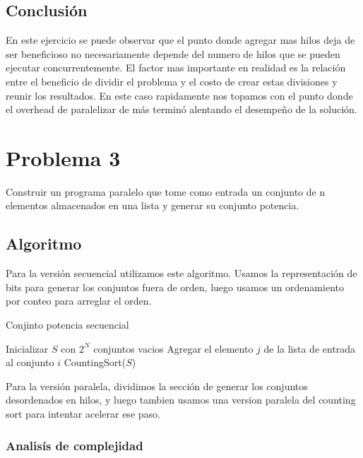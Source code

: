 \documentclass{report}
\begin{document}
\section{Conclusión}

En este ejercicio se puede observar que el punto donde agregar mas hilos deja de ser
beneficioso no necesariamente depende del numero de hilos que se pueden ejecutar
concurrentemente. El factor mas importante en realidad es la relación entre el
beneficio de dividir el problema y el costo de crear estas divisiones y reunir los
resultados. En este caso rapidamente nos topamos con el punto donde el overhead
de paralelizar de más terminó alentando el desempeño de la solución.

\chapter{Problema 3}

Construir un programa paralelo que tome como entrada un conjunto de n elementos
almacenados en una lista y generar su conjunto potencia.

\section{Algoritmo}

Para la versión secuencial utilizamos este algoritmo. Usamos la representación
de bits para generar los conjuntos fuera de orden, luego usamos un ordenamiento
por conteo para arreglar el orden.

\begin{algorithm}
\caption{Conjinto potencia secuencial}\label{euclid}
\begin{algorithmic}[1]
\State Inicializar $S$ con $2^N$ conjuntos vacios
      \State Agregar el elemento $j$ de la lista de entrada al conjunto $i$
    \EndIf
  \EndFor
\EndFor
\State CountingSort($S$)
\EndProcedure
\end{algorithmic}
\end{algorithm}

Para la versión paralela, dividimos la sección de generar los conjuntos desordenados
en hilos, y luego tambien usamos una version paralela del counting sort para
intentar acelerar ese paso.

\subsection{Analisís de complejidad}
\end{document}

